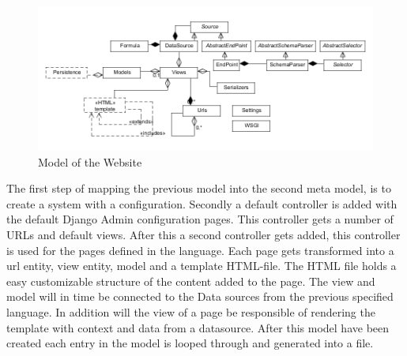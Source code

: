 \begin{figure}
\begin{center}
\includegraphics[width=\linewidth]{images/websitemodel}
\end{center}
\caption{Model of the Website}
\label{fig:websitemodel}
\end{figure}

The first step of mapping the previous model into the second meta model, is to create a system with a configuration. 
Secondly a default controller is added with the default Django Admin configuration pages. 
This controller gets a number of URLs and default views. 
After this a second controller gets added, this controller is used for the pages defined in the language. 
Each page gets transformed into a url entity, view entity, model and a template HTML-file.
The HTML file holds a easy customizable structure of the content added to the page. The view and model will in time be connected to the Data sources from the previous specified language. 
In addition will the view of a page be responsible of rendering the template with context and data from a datasource. 
After this model have been created each entry in the model is looped through and generated into a file.


